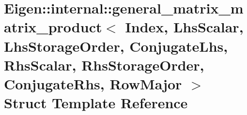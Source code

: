 \hypertarget{struct_eigen_1_1internal_1_1general__matrix__matrix__product_3_01_index_00_01_lhs_scalar_00_01_l7e45e4188e95a69de1c658ab4a83c882}{}\section{Eigen\+:\+:internal\+:\+:general\+\_\+matrix\+\_\+matrix\+\_\+product$<$ Index, Lhs\+Scalar, Lhs\+Storage\+Order, Conjugate\+Lhs, Rhs\+Scalar, Rhs\+Storage\+Order, Conjugate\+Rhs, Row\+Major $>$ Struct Template Reference}
\label{struct_eigen_1_1internal_1_1general__matrix__matrix__product_3_01_index_00_01_lhs_scalar_00_01_l7e45e4188e95a69de1c658ab4a83c882}
